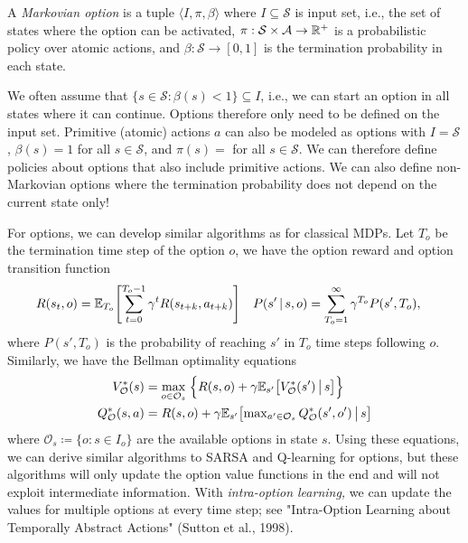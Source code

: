 		\begin{definition}
			A \emph{Markovian option} is a tuple \( \langle I, \pi, \beta \rangle \) where \( I \subseteq \mathcal{S} \) is input set, i.e., the set of states where the option can be activated, \( \pi : \mathcal{S} \times \mathcal{A} \to \mathbb{R}^+ \) is a probabilistic policy over atomic actions, and \( \beta : \mathcal{S} \to [0, 1] \) is the termination probability in each state.
		\end{definition}
		We often assume that \( \{ s \in \mathcal{S} : \beta(s) < 1 \} \subseteq I \), i.e., we can start an option in all states where it can continue. Options therefore only need to be defined on the input set. Primitive (atomic) actions \(a\) can also be modeled as options with \(I = \mathcal{S}\), \( \beta(s) = 1 \) for all \(s \in \mathcal{S}\), and \(\pi(s) = \) for all \(s \in \mathcal{S}\). We can therefore define policies about options that also include primitive actions. We can also define non-Markovian options where the termination probability does not depend on the current state only!

		For options, we can develop similar algorithms as for classical \acp{MDP}. Let \(T_o\) be the termination time step of the option \(o\), we have the option reward and option transition function
		\begin{align}
			R(s_t, o) &= \mathbb{E}_{T_o}\Biggl[ \sum_{t = 0}^{T_o - 1} \gamma^t R(s_{t + k}, a_{t + k}) \Biggr] &
			P(s' \,\vert\, s, o) &= \sum_{T_o = 1}^{\infty} \gamma^{T_o} P(s', T_o),
		\end{align}
		where \(P(s', T_o)\) is the probability of reaching \(s'\) in \(T_o\) time steps following \(o\). Similarly, we have the Bellman optimality equations
		\begin{align}
			V_{\mathcal{O}}^\ast(s) &= \max_{o \in \mathcal{O}_s} \;\Bigl\{ R(s, o) + \gamma \mathbb{E}_{s'}\bigl[ V_\mathcal{O}^\ast(s') \,\big\vert\, s \bigr] \Bigr\} \\
			Q_\mathcal{O}^\ast(s, a) &= R(s, o) + \gamma \mathbb{E}_{s'}\bigl[ \textstyle\max_{a' \in \mathcal{O}_s}\displaystyle Q_\mathcal{O}^\ast(s', o') \,\big\vert\, s \bigr]
		\end{align}
		where \( \mathcal{O}_s \coloneqq \{ o : s \in I_o \} \) are the available options in state \(s\). Using these equations, we can derive similar algorithms to \ac{SARSA} and Q-learning for options, but these algorithms will only update the option value functions in the end and will not exploit intermediate information. With \emph{intra-option learning,} we can update the values for multiple options at every time step; see "Intra-Option Learning about Temporally Abstract Actions" (Sutton et al., 1998).

